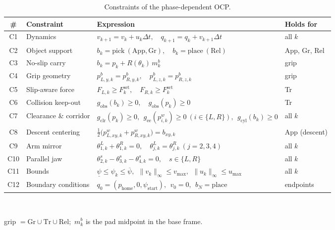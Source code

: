 \documentclass[letterpaper, 10 pt, conference]{ieeeconf}  %
\begin{document}
\begin{table}[!t]
\centering
\caption{Constraints of the phase-dependent OCP.}
\label{tab:ocp_prob}
\scriptsize
\renewcommand{\arraystretch}{1.05}
\begin{tabularx}{\textwidth}{@{}c l X l@{}}
\toprule
\textbf{\#} & \textbf{Constraint} & \textbf{Expression} & \textbf{Holds for}\\
\midrule
C1  & Dynamics              & $v_{k+1}=v_k+u_k\Delta t,\quad q_{k+1}=q_k+v_{k+1}\Delta t$ & all $k$\\
C2  & Object support        & $b_k=\mathrm{pick}\ (\mathrm{App,Gr}),\quad b_k=\mathrm{place}\ (\mathrm{Rel})$ & App, Gr, Rel\\
C3  & No-slip carry         & $b_k=p_k+R(\theta_k)\,m^{b}_k$ & grip\\
C4  & Grip geometry         & $p^{b}_{L,y,k}=p^{b}_{R,y,k},\quad p^{b}_{L,z,k}=p^{b}_{R,z,k}$ & grip\\
C5  & Slip-aware force      & $F_{L,k}\ge F^{\mathrm{set}}_k,\quad F_{R,k}\ge F^{\mathrm{set}}_k$ & Tr\\
C6  & Collision keep-out    & $g_{\mathrm{obs}}(b_k)\ge 0,\quad g_{\mathrm{obs}}(p_k)\ge 0$ & Tr\\
C7  & Clearance \& corridor & $g_{\mathrm{clr}}(p_k)\ge 0,\ \ g_{\mathrm{ee}}(p^{w}_{i,k})\ge0\ (i{\in}\{L,R\}),\ \ g_{\mathrm{cyl}}(b_k)\ge 0$ & all $k$\\
C8  & Descent centering     & $\tfrac12\big(p^{w}_{L,xy,k}+p^{w}_{R,xy,k}\big)=b_{xy,k}$ & App (descent)\\
C9  & Arm mirror            & $\theta^{L}_{1,k}+\theta^{R}_{1,k}=0,\quad \theta^{L}_{j,k}=\theta^{R}_{j,k}\ (j{=}2,3,4)$ & all $k$\\
C10 & Parallel jaw          & $\theta^{s}_{2,k}-\theta^{s}_{3,k}-\theta^{s}_{4,k}=0,\quad s\in\{L,R\}$ & all $k$\\
C11 & Bounds                & $\underline{\psi}\le\psi_k\le\overline{\psi},\ \ \|v_k\|_\infty\le v_{\max},\ \ \|u_k\|_\infty\le u_{\max}$ & all $k$\\
C12 & Boundary conditions   & $q_0=(p_{\mathrm{home}},0,\psi_{\mathrm{start}}),\ \ v_0=0,\ \ b_N=\mathrm{place}$ & endpoints\\
\bottomrule
\end{tabularx}
\\[1pt]
{\scriptsize\raggedright
grip $=\mathrm{Gr}\cup\mathrm{Tr}\cup\mathrm{Rel}$;\ $m^{b}_k$ is the pad midpoint in the base frame.\par}
\end{table}
\end{document}
